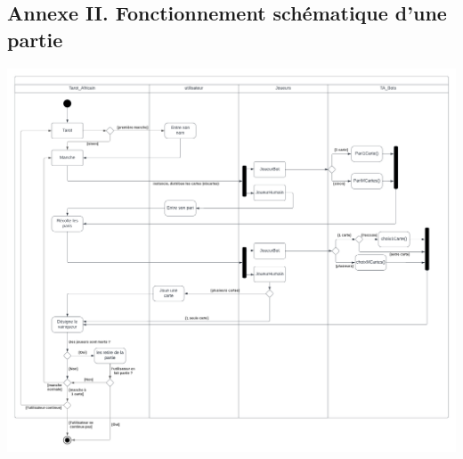 \begin{landscape}
   \section*{Annexe II. Fonctionnement schématique d'une partie}
   \begin{center}
      \includegraphics[height=.92\textwidth]{imgs/actDiagram}
   \end{center}
\end{landscape}